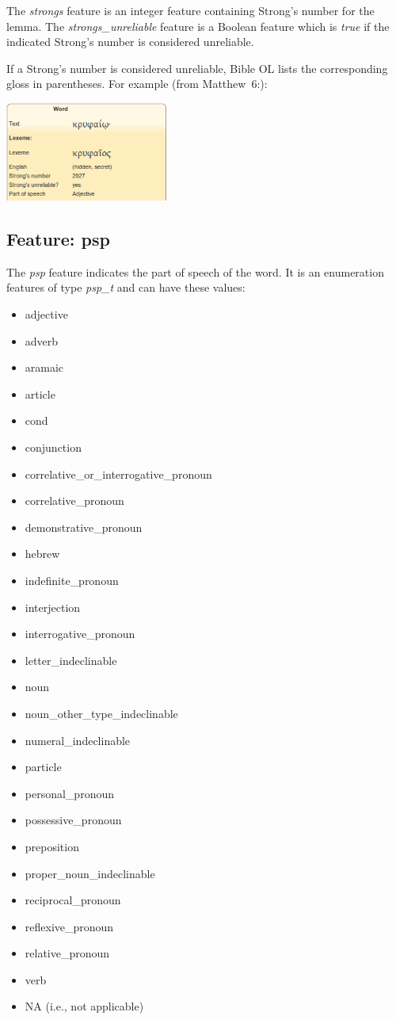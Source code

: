 \documentclass[11pt,oneside,a4paper]{memoir}
\newcommand*{\bibleref}[3]{#1~#2\thinspace:\thinspace#3}
\begin{document}
The \emph{strongs} feature is an integer feature containing Strong's number for the lemma. The
\emph{strongs\_unreliable} feature is a Boolean feature which is \emph{true} if the indicated
Strong's number is considered unreliable.

If a Strong's number is considered unreliable, Bible OL lists the corresponding gloss in
parentheses. For example (from \bibleref{Matthew}{6}{18}):

\begin{center}
  \includegraphics[width=0.4\textwidth]{unreliable.png}
\end{center}

\subsection{Feature: psp}

The \emph{psp} feature indicates the part of speech of the word. It is an enumeration features of
type \emph{psp\_t} and can have these values:

\begin{itemize}
\item adjective
\item adverb
\item aramaic
\item article
\item cond
\item conjunction
\item correlative\_or\_interrogative\_pronoun
\item correlative\_pronoun
\item demonstrative\_pronoun
\item hebrew
\item indefinite\_pronoun
\item interjection
\item interrogative\_pronoun
\item letter\_indeclinable
\item noun
\item noun\_other\_type\_indeclinable
\item numeral\_indeclinable
\item particle
\item personal\_pronoun
\item possessive\_pronoun
\item preposition
\item proper\_noun\_indeclinable
\item reciprocal\_pronoun
\item reflexive\_pronoun
\item relative\_pronoun
\item verb
\item NA (i.e., not applicable)
\end{itemize}
\end{document}
